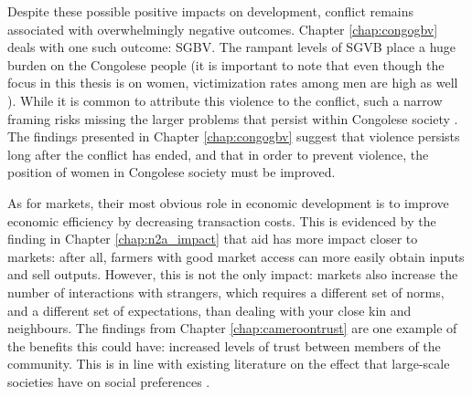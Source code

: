 Despite these possible positive impacts on development, conflict remains associated with overwhelmingly negative outcomes. Chapter \ref{chap:congogbv} deals with one such outcome: SGBV. The rampant levels of SGVB place a huge burden on the Congolese people (it is important to note that even though the focus in this thesis is on women, victimization rates among men are high as well \citep{Christian2011}). While it is common to attribute this violence to the conflict, such a narrow framing risks missing the larger problems that persist within Congolese society \citep[see e.g.][]{Autesserre2012a}. The findings presented in Chapter \ref{chap:congogbv} suggest that violence persists long after the conflict has ended, and that in order to prevent violence, the position of women in Congolese society must be improved.

As for markets, their most obvious role in economic development is to improve economic efficiency by decreasing transaction costs. This is evidenced by the finding in Chapter \ref{chap:n2a_impact} that aid has more impact closer to markets: after all, farmers with good market access can more easily obtain inputs and sell outputs. However, this is not the only impact: markets also increase the number of interactions with strangers, which requires a different set of norms, and a different set of expectations, than dealing with your close kin and neighbours. The findings from Chapter \ref{chap:cameroontrust} are one example of the benefits this could have: increased levels of trust between members of the community. This is in line with existing literature on the effect that large-scale societies have on social preferences \citep{Henrich2010}.

